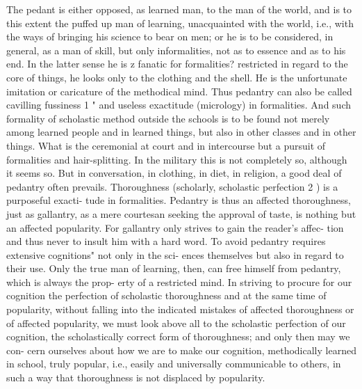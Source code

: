 The pedant is either opposed, as learned man, to the man of the world,
and is to this extent the puffed up man of learning, unacquainted with the
world, i.e., with the ways of bringing his science to bear on men; or he is to
be considered, in general, as a man of skill, but only informalities, not as to
essence and as to his end. In the latter sense he is z fanatic for formalities?
restricted in regard to the core of things, he looks only to the clothing and
the shell. He is the unfortunate imitation or caricature of the methodical
mind. Thus pedantry can also be called cavilling fussiness 1 " and useless
exactitude (micrology) in formalities. And such formality of scholastic
method outside the schools is to be found not merely among learned
people and in learned things, but also in other classes and in other things.
What is the ceremonial at court and in intercourse but a pursuit of formalities
and hair-splitting. In the military this is not completely so, although it
seems so. But in conversation, in clothing, in diet, in religion, a good deal
of pedantry often prevails.
Thoroughness (scholarly, scholastic perfection 2 ) is a purposeful exacti-
tude in formalities. Pedantry is thus an affected thoroughness, just as
gallantry, as a mere courtesan seeking the approval of taste, is nothing but
an affected popularity. For gallantry only strives to gain the reader's affec-
tion and thus never to insult him with a hard word.
To avoid pedantry requires extensive cognitions" not only in the sci-
ences themselves but also in regard to their use. Only the true man of
learning, then, can free himself from pedantry, which is always the prop-
erty of a restricted mind.
In striving to procure for our cognition the perfection of scholastic
thoroughness and at the same time of popularity, without falling into the
indicated mistakes of affected thoroughness or of affected popularity, we
must look above all to the scholastic perfection of our cognition, the
scholastically correct form of thoroughness; and only then may we con-
cern ourselves about how we are to make our cognition, methodically
learned in school, truly popular, i.e., easily and universally communicable
to others, in such a way that thoroughness is not displaced by popularity.

